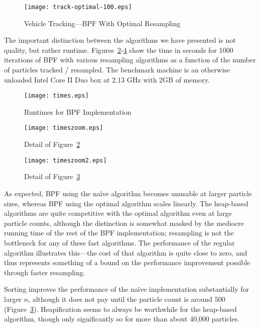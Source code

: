 \documentclass[12pt]{article}
\begin{document}
  \begin{figure}
    \centering
    \texttt{[image: track-optimal-100.eps]}
    \caption{Vehicle Tracking---BPF With Optimal Resampling}\label{fig-track-optimal}
  \end{figure}

  The important distinction between the algorithms we have
  presented is not
  quality, but rather runtime.
  Figures~\ref{fig-times}-\ref{fig-timeszoom2} show the time
  in seconds for 1000 iterations of BPF with various
  resampling algorithms as a function of the number of
  particles tracked / resampled.  The benchmark machine is
  an otherwise unloaded Intel Core II Duo box at 2.13 GHz
  with 2GB of memory.

  \begin{figure}
    \centering
    \texttt{[image: times.eps]}
    \caption{Runtimes for BPF Implementation}\label{fig-times}
  \end{figure}

  \begin{figure}
    \centering
    \texttt{[image: timeszoom.eps]}
    \caption{Detail of Figure~\ref{fig-times}}\label{fig-timeszoom}
  \end{figure}

  \begin{figure}
    \centering
    \texttt{[image: timeszoom2.eps]}
    \caption{Detail of Figure~\ref{fig-timeszoom}}\label{fig-timeszoom2}
  \end{figure}

  As expected, BPF using the na\"ive
  algorithm becomes unusable at larger particle sizes,
  whereas BPF using the optimal algorithm scales linearly.
  The heap-based algorithms are quite competitive with the
  optimal algorithm even at large particle counts, although
  the distinction is somewhat masked by the mediocre running
  time of the rest of the BPF implementation; resampling is
  not the bottleneck for any of these fast algorithms.  The
  performance of the regular algorithm illustrates
  this---the cost of that algorithm is quite close to zero,
  and thus represents something of a bound on the
  performance improvement possible through faster resampling.

  Sorting improves the performance of the na\"ive
  implementation substantially for larger $n$, although it
  does not pay until the particle count is around 500
  (Figure~\ref{fig-timeszoom}).  Heapification seems to
  always be worthwhile for the heap-based algorithm, though
  only significantly so for more than about 40,000
  particles.
\end{document}
